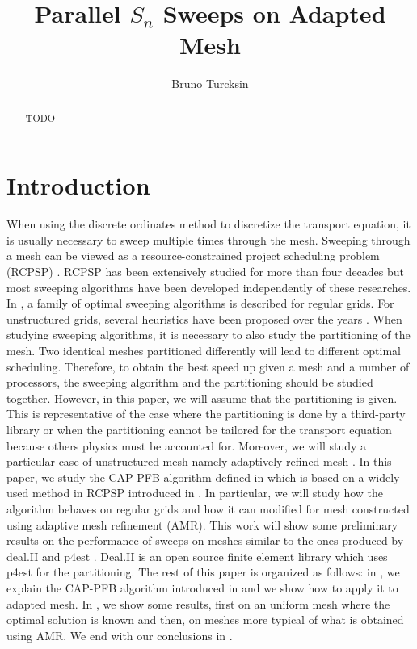 \documentclass[letterpaper]{article}
\renewcommand{\(}{\left(}
\renewcommand{\)}{\right)}
\renewcommand{\[}{\left[}
\renewcommand{\]}{\right]}
\begin{document}
\title{Parallel $S_n$ Sweeps on Adapted Mesh}
\author{Bruno Turcksin} 
\date{}
\maketitle

\begin{abstract}
  TODO
\end{abstract}

\section{Introduction}
When using the discrete ordinates method to discretize the transport equation,
it is usually necessary to sweep multiple times through the mesh. Sweeping through a mesh can
be viewed as a resource-constrained project scheduling problem (RCPSP)
\cite{Brucker1999,Kolisch2006}. RCPSP has been extensively studied for more than
four decades \cite{Pritsker1969} but most sweeping algorithms have been
developed independently of these researches. In \cite{Adams2013}, a family of
optimal sweeping algorithms is described for regular grids. For
unstructured grids, several heuristics have been proposed over the years
\cite{Pautz2002,Plimpton2005,Yan2013,Colomer2013,Kumar2005}. When studying
sweeping algorithms, it is necessary to also study the partitioning of the mesh.
Two identical meshes partitioned differently will lead to different optimal
scheduling. Therefore, to obtain the best speed up given a mesh and a number of
processors, the sweeping algorithm and the partitioning should be studied
together. However, in this paper, we will assume that the partitioning is given.
This is representative of the case where the partitioning is
done by a third-party library or when the partitioning cannot be tailored for the
transport equation because others physics must be accounted for. Moreover, we
will study a particular case of unstructured mesh namely adaptively refined mesh
\cite{Arnold2000,Baker2002,Bangerth2007,Jessee1998,Wang2010a}. In this paper, we
study the CAP-PFB algorithm defined in \cite{Mo2014} which is based on a widely
used method in RCPSP introduced in \cite{Li1992}. In particular, we will study
how the algorithm behaves on regular grids and how it can modified for mesh
constructed using adaptive mesh refinement (AMR). This work will show some
preliminary results on the performance of sweeps on meshes similar to the ones
produced by deal.II \cite{Bangerth2007,Bangerth2013} and p4est
\cite{Burstedde2011}. Deal.II is an open source finite element library which
uses p4est for the partitioning. The rest of this paper is organized as follows:
in , we explain the
CAP-PFB algorithm introduced in \cite{Mo2014} and we show how to apply it to
adapted mesh. In , we show some results, first on an uniform mesh
where the optimal solution is known and then, on meshes more typical of what is
obtained using AMR. We end with our conclusions in .
\end{document}
